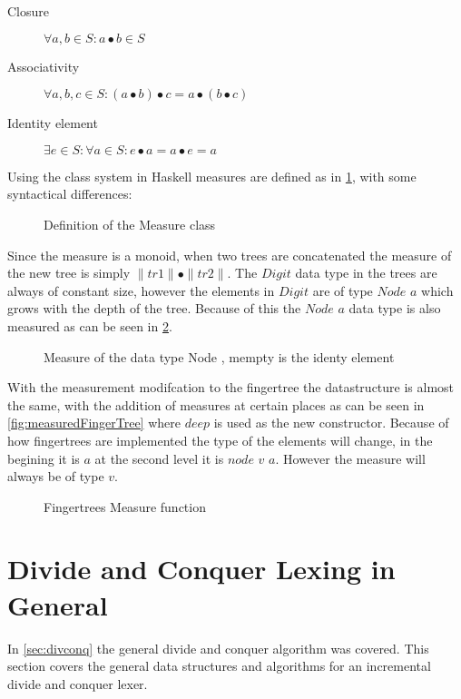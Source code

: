 \begin{description}
\item[Closure] $\forall a,b \in S: a \bullet b \in S$
\item[Associativity] $\forall a,b,c \in S: (a \bullet b) \bullet c = a \bullet
    (b \bullet c)$ 
\item[Identity element] $\exists e \in S: \forall a \in S: e \bullet a = a
    \bullet e = a$
\end{description}

Using the class system in Haskell measures are defined as in \cref{fig:measure},
with some syntactical differences:

\begin{figure}[h!]

\caption{Definition of the Measure class \label{fig:measure}}
\end{figure}

Since the measure is a monoid, when two trees are concatenated the measure of 
the new tree is simply $\parallel tr1 \parallel \bullet \parallel tr2 \parallel$.
The $Digit$ data type in the trees are always of constant size, however the
elements in $Digit$ are of type $Node$ $a$ which grows with the depth of the tree.
Because of this the $Node$ $a$ data type is also measured as can be seen in
\cref{fig:measureNode}.

\begin{figure}[h!]

\caption{Measure of the data type Node \label{fig:measureNode}, mempty is the identy element}
\end{figure}

With the measurement modifcation to the fingertree the datastructure is almost
the same, with the addition of measures at certain places as can be seen in
\cref{fig:measuredFingerTree} where $deep$ is used as the new constructor.
Because of how fingertrees are implemented the type of the elements will change,
in the begining it is $a$ at the second level it is $node$ $v$ $a$. However the
measure will always be of type $v$.

\begin{figure}[h!]

\caption{Fingertrees Measure function \label{fig:measureFingerTree}}
\end{figure}

\section{Divide and Conquer Lexing in General}
In \cref{sec:divconq} the general divide and conquer algorithm was covered. This
section covers the general data structures and algorithms for an incremental
divide and conquer lexer.

